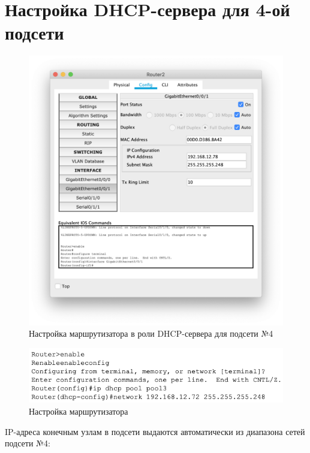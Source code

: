 \section{Настройка DHCP-сервера для 4-ой подсети}%
\label{sec:4_net}
\begin{figure}[H]
    \centering
    \includegraphics[width=0.8\linewidth]{images/router_2.png}
    \caption{Настройка маршрутизатора в роли DHCP-сервера для подсети №4}%
\end{figure}

\begin{figure}[H]
    \centering
    \includegraphics[width=0.8\linewidth]{images/router_2_conf.png}
    \caption{Настройка маршрутизатора}%
\end{figure}

IP-адреса конечным узлам в подсети выдаются автоматически из диапазона сетей подсети №4:

